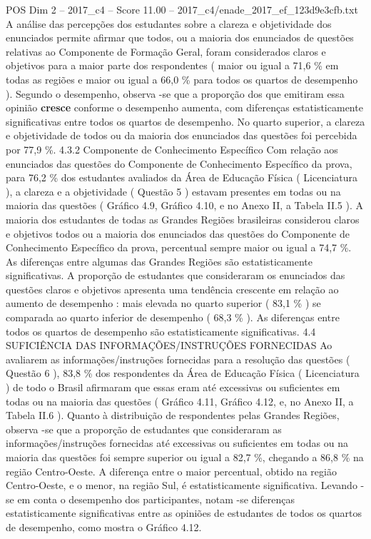 \begin{textsample}{POS Dim 2 – 2017\_c4 – Score 11.00 – 2017\_c4/enade\_2017\_ef\_123d9e3cfb.txt}
A análise das percepções dos estudantes sobre a clareza e objetividade dos enunciados permite afirmar que todos, ou a maioria dos enunciados de questões relativas ao Componente de Formação Geral, foram considerados claros e objetivos para a maior parte dos respondentes ( maior ou igual a 71,6 \% em todas as regiões e maior ou igual a 66,0 \% para todos os quartos de desempenho ).
Segundo o desempenho, observa -se que a proporção dos que emitiram essa opinião \textbf{cresce} conforme o desempenho aumenta, com diferenças estatisticamente significativas entre todos os quartos de desempenho.
No quarto superior, a clareza e objetividade de todos ou da maioria dos enunciados das questões foi percebida por 77,9 \%. 4.3.2 Componente de Conhecimento Específico Com relação aos enunciados das questões do Componente de Conhecimento Específico da prova, para 76,2 \% dos estudantes avaliados da Área de Educação Física ( Licenciatura ), a clareza e a objetividade ( Questão 5 ) estavam presentes em todas ou na maioria das questões ( Gráfico 4.9, Gráfico 4.10, e no Anexo II, a Tabela II.5 ).
A maioria dos estudantes de todas as Grandes Regiões brasileiras considerou claros e objetivos todos ou a maioria dos enunciados das questões do Componente de Conhecimento Específico da prova, percentual sempre maior ou igual a 74,7 \%.
As diferenças entre algumas das Grandes Regiões são estatisticamente significativas.
A proporção de estudantes que consideraram os enunciados das questões claros e objetivos apresenta uma tendência crescente em relação ao aumento de desempenho : mais elevada no quarto superior ( 83,1 \% ) se comparada ao quarto inferior de desempenho ( 68,3 \% ).
As diferenças entre todos os quartos de desempenho são estatisticamente significativas. 4.4 SUFICIÊNCIA DAS INFORMAÇÕES/INSTRUÇÕES FORNECIDAS Ao avaliarem as informações/instruções fornecidas para a resolução das questões ( Questão 6 ), 83,8 \% dos respondentes da Área de Educação Física ( Licenciatura ) de todo o Brasil afirmaram que essas eram até excessivas ou suficientes em todas ou na maioria das questões ( Gráfico 4.11, Gráfico 4.12, e, no Anexo II, a Tabela II.6 ).
Quanto à distribuição de respondentes pelas Grandes Regiões, observa -se que a proporção de estudantes que consideraram as informações/instruções fornecidas até excessivas ou suficientes em todas ou na maioria das questões foi sempre superior ou igual a 82,7 \%, chegando a 86,8 \% na região Centro-Oeste.
A diferença entre o maior percentual, obtido na região Centro-Oeste, e o menor, na região Sul, é estatisticamente significativa.
Levando -se em conta o desempenho dos participantes, notam -se diferenças estatisticamente significativas entre as opiniões de estudantes de todos os quartos de desempenho, como mostra o Gráfico 4.12.

\end{textsample}
